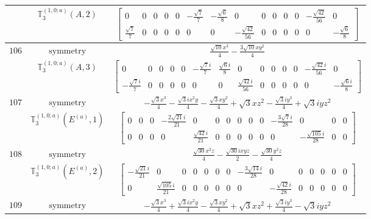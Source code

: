 \documentclass[fleqn,8pt,landscape]{jsarticle}
\begin{document}
\begin{longtable}{ccc}
$  $ & $ \mathbb{T}_{3}^{(1,0;a)}(A,2) $ & $ \begin{bmatrix} 0 & 0 & 0 & 0 & 0 & - \frac{\sqrt{7}}{7} & - \frac{\sqrt{6}}{8} & 0 & 0 & 0 & 0 & 0 & - \frac{\sqrt{42}}{56} & 0 \\ \frac{\sqrt{7}}{7} & 0 & 0 & 0 & 0 & 0 & 0 & - \frac{\sqrt{42}}{56} & 0 & 0 & 0 & 0 & 0 & - \frac{\sqrt{6}}{8} \end{bmatrix} $ \\ \hline
$ 106 $ & $ \text{symmetry} $ & $ \frac{\sqrt{10} x^{3}}{4} - \frac{3 \sqrt{10} x y^{2}}{4} $ \\
$  $ & $ \mathbb{T}_{3}^{(1,0;a)}(A,3) $ & $ \begin{bmatrix} 0 & 0 & 0 & 0 & 0 & - \frac{\sqrt{7} i}{7} & \frac{\sqrt{6} i}{8} & 0 & 0 & 0 & 0 & 0 & - \frac{\sqrt{42} i}{56} & 0 \\ - \frac{\sqrt{7} i}{7} & 0 & 0 & 0 & 0 & 0 & 0 & \frac{\sqrt{42} i}{56} & 0 & 0 & 0 & 0 & 0 & - \frac{\sqrt{6} i}{8} \end{bmatrix} $ \\ \hline
$ 107 $ & $ \text{symmetry} $ & $ - \frac{\sqrt{3} x^{3}}{4} - \frac{\sqrt{3} i x^{2} y}{4} - \frac{\sqrt{3} x y^{2}}{4} + \sqrt{3} x z^{2} - \frac{\sqrt{3} i y^{3}}{4} + \sqrt{3} i y z^{2} $ \\
$  $ & $ \mathbb{T}_{3}^{(1,0;a)}(E^{(a)},1) $ & $ \begin{bmatrix} 0 & 0 & 0 & - \frac{2 \sqrt{21} i}{21} & 0 & 0 & 0 & 0 & 0 & 0 & - \frac{3 \sqrt{7} i}{28} & 0 & 0 & 0 \\ 0 & 0 & 0 & 0 & \frac{\sqrt{42} i}{21} & 0 & 0 & 0 & 0 & 0 & 0 & - \frac{\sqrt{105} i}{28} & 0 & 0 \end{bmatrix} $ \\ \hline
$ 108 $ & $ \text{symmetry} $ & $ \frac{\sqrt{30} x^{2} z}{4} - \frac{\sqrt{30} i x y z}{2} - \frac{\sqrt{30} y^{2} z}{4} $ \\
$  $ & $ \mathbb{T}_{3}^{(1,0;a)}(E^{(a)},2) $ & $ \begin{bmatrix} - \frac{\sqrt{21} i}{21} & 0 & 0 & 0 & 0 & 0 & 0 & - \frac{3 \sqrt{14} i}{28} & 0 & 0 & 0 & 0 & 0 & 0 \\ 0 & \frac{\sqrt{105} i}{21} & 0 & 0 & 0 & 0 & 0 & 0 & - \frac{\sqrt{42} i}{28} & 0 & 0 & 0 & 0 & 0 \end{bmatrix} $ \\ \hline
$ 109 $ & $ \text{symmetry} $ & $ - \frac{\sqrt{3} x^{3}}{4} + \frac{\sqrt{3} i x^{2} y}{4} - \frac{\sqrt{3} x y^{2}}{4} + \sqrt{3} x z^{2} + \frac{\sqrt{3} i y^{3}}{4} - \sqrt{3} i y z^{2} $ \\

\end{longtable}
\end{document}
